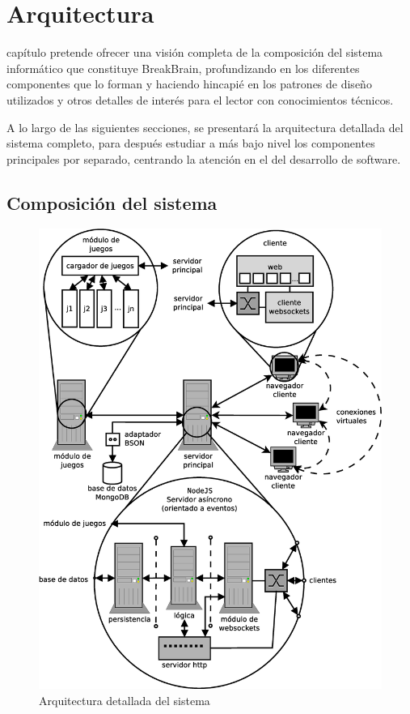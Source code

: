 \chapter{Arquitectura}
\label{chap:arquitectura}

 capítulo pretende ofrecer una visión completa de la composición del sistema informático que constituye BreakBrain, profundizando en los diferentes componentes que lo forman y haciendo hincapié en los patrones de diseño utilizados y otros detalles de interés para el lector con conocimientos técnicos.

A lo largo de las siguientes secciones, se presentará la arquitectura detallada del sistema completo, para después estudiar a más bajo nivel los componentes principales por separado, centrando la atención en el del desarrollo de software.

\section{Composición del sistema}

\begin{figure}[h]
  \begin{center}
    \includegraphics[width=\textwidth]{images/arquitectura.eps}
    \caption{Arquitectura detallada del sistema}
    \label{fig::arquitectura}
  \end{center}
\end{figure}

